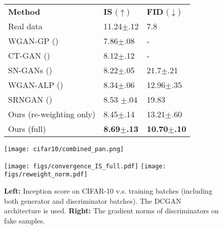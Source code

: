 \documentclass{article}
\newcommand{\0}{\bm{0}}
\begin{document}
\begin{figure}[t]
\begin{minipage}{0.47\textwidth}
\vspace{-0.8em}
\setlength{\tabcolsep}{2.2pt}  
\renewcommand{\arraystretch}{0.85} 
\footnotesize
  \centering
  \begin{tabular}{@{}lll@{}}
    \toprule
    {\bf Method}     & {\bf IS} ($\uparrow$) & {\bf FID} ($\downarrow$) \\
    \cmidrule{1-3}
    Real data & 11.24$\pm$.12 & 7.8\\
\cmidrule{1-3}
WGAN-GP (\citeyear{wgangp}) & 7.86$\pm$.08 & - \\
    CT-GAN (\citeyear{wwgan}) &  8.12$\pm$.12 & - \\
    SN-GANs (\citeyear{SNGAN}) & 8.22$\pm$.05 & 21.7$\pm$.21 \\
    WGAN-ALP (\citeyear{wganalp}) & 8.34$\pm$.06 & 12.96$\pm$.35\\
    SRNGAN (\citeyear{srngan}) & 8.53 $\pm$.04 & 19.83\\
Ours {(re-weighting only)} & 8.45$\pm$.14 & 13.21$\pm$.60 \\
    Ours (full) & \textbf{8.69$\pm$.13} &\textbf{10.70$\pm$.10}\\
    \bottomrule
  \end{tabular}
  \vspace{-5pt}
   \label{tab:exp:image:IS_FID}
\vskip -0.4in
\end{minipage}
\hfill
\begin{minipage}{0.51\textwidth}
\begin{center}
\centerline{
\texttt{[image: cifar10/combined\_pan.png]}
}
\vskip -0.1in
\label{cifar10_combined}
\end{center}
\end{minipage}
\vspace{-15pt}
\end{figure}

\begin{figure}[t]
\begin{center}
\texttt{[image: figs/convergence\_IS\_full.pdf]}
\hspace{7pt}
\texttt{[image: figs/reweight\_norm.pdf]}
\vspace{-2pt}
\caption{{\bf Left:}  Inception score on CIFAR-10 v.s. training batches (including both generator and discriminator batches). The DCGAN~\cite{DCGAN} architecture is used. {\bf Right:} The gradient norms of discriminators on fake samples. 
}
\label{fig:image:converge}
\end{center}
\vspace{-5pt}
\end{figure}
\end{document}
